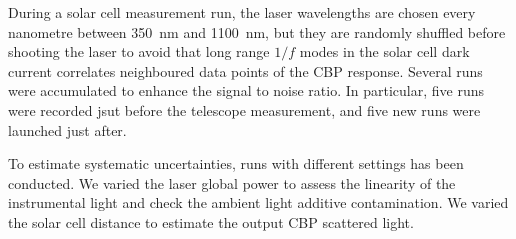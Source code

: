 \documentclass[printer]{aa}
\newcommand{\Oldthorlabs}{SM05PD1B}
\begin{document}
During a solar cell measurement run, the laser wavelengths are chosen every nanometre between \SI{350}{\nano\meter} and \SI{1100}{\nano\meter}, but they are randomly shuffled before shooting the laser to avoid that long range $1/f$ modes in the solar cell dark current correlates neighboured data points of the CBP response. Several runs were accumulated to enhance the signal to noise ratio. In particular, five runs were recorded jsut before the \SD telescope measurement, and five new runs were launched just after.


To estimate systematic uncertainties, runs with different settings has been conducted. We varied the laser global power to assess the linearity of the instrumental light and check the ambient light additive contamination. We varied the solar cell distance to estimate the output CBP scattered light.

%
%
%


%
%
%
%
\end{document}

